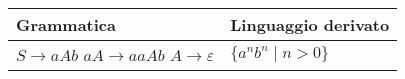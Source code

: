 \documentclass{standalone}
\begin{document}
\begin{tabularx}{\textwidth}{XX}
		Grammatica & Linguaggio derivato \\
    \midrule
        \(S \to aAb\) \newline
        \(aA \to aaAb\) \newline
        \(A \to \varepsilon\) 
        &
        \(\{a^n b^n \mid n>0\}\)
\end{tabularx}
\end{document}
